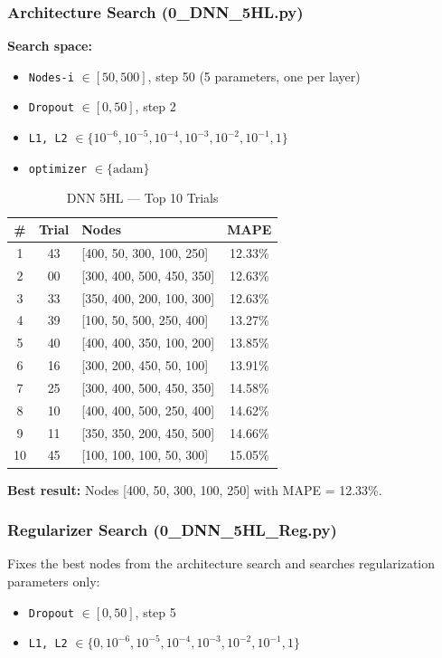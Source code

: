 \documentclass[11pt,a4paper]{article}
\begin{document}
\subsubsection*{Architecture Search (0\_DNN\_5HL.py)}
\textbf{Search space:}
\begin{itemize}
    \item \texttt{Nodes-i} $\in [50, 500]$, step 50 (5 parameters, one per layer)
    \item \texttt{Dropout} $\in [0, 50]$, step 2
    \item \texttt{L1, L2} $\in \{10^{-6}, 10^{-5}, 10^{-4}, 10^{-3}, 10^{-2}, 10^{-1}, 1\}$
    \item \texttt{optimizer} $\in \{\text{adam}\}$
\end{itemize}

\begin{table}[H]
\centering
\caption{DNN 5HL — Top 10 Trials}
\begin{tabular}{cclc}
\toprule
\textbf{\#} & \textbf{Trial} & \textbf{Nodes} & \textbf{MAPE} \\
\midrule
1 & 43 & [400, 50, 300, 100, 250] & 12.33\% \\
2 & 00 & [300, 400, 500, 450, 350] & 12.63\% \\
3 & 33 & [350, 400, 200, 100, 300] & 12.63\% \\
4 & 39 & [100, 50, 500, 250, 400]  & 13.27\% \\
5 & 40 & [400, 400, 350, 100, 200] & 13.85\% \\
6 & 16 & [300, 200, 450, 50, 100]  & 13.91\% \\
7 & 25 & [300, 400, 500, 450, 350] & 14.58\% \\
8 & 10 & [400, 400, 500, 250, 400] & 14.62\% \\
9 & 11 & [350, 350, 200, 450, 500] & 14.66\% \\
10 & 45 & [100, 100, 100, 50, 300]  & 15.05\% \\
\bottomrule
\end{tabular}
\end{table}

\textbf{Best result:} Nodes [400, 50, 300, 100, 250] with MAPE = 12.33\%.

\subsubsection*{Regularizer Search (0\_DNN\_5HL\_Reg.py)}

Fixes the best nodes from the architecture search and searches regularization parameters only:
\begin{itemize}
    \item \texttt{Dropout} $\in [0, 50]$, step 5
    \item \texttt{L1, L2} $\in \{0, 10^{-6}, 10^{-5}, 10^{-4}, 10^{-3}, 10^{-2}, 10^{-1}, 1\}$
\end{itemize}
\end{document}
